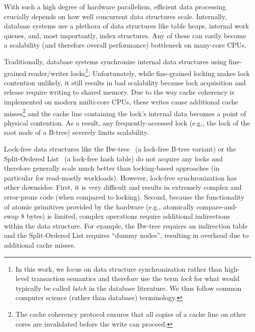 \documentclass[11pt]{article}
\begin{document}
With such a high degree of hardware parallelism, efficient data processing crucially depends on how well concurrent data structures scale.
Internally, database systems use a plethora of data structures like table heaps, internal work queues, and, most importantly, index structures.
Any of these can easily become a scalability (and therefore overall performance) bottleneck on many-core CPUs.

Traditionally, database systems synchronize internal data structures using fine-grained reader/writer locks\footnote{In this work, we focus on data structure synchronization rather than high-level transaction semantics and therefore use the term {\em lock} for what would typically be called {\em latch} in the database literature. We thus follow common computer science (rather than database) terminology.}.
Unfortunately, while fine-grained locking makes lock contention unlikely, it still results in bad scalability because lock acquisition and release require writing to shared memory.
Due to the way cache coherency is implemented on modern multi-core CPUs, these writes cause additional cache misses\footnote{The cache coherency protocol ensures that all copies of a cache line on other cores are invalidated before the write can proceed.} and the cache line containing the lock's internal data becomes a point of physical contention.
As a result, any frequently-accessed lock (e.g., the lock of the root node of a B-tree) severely limits scalability.

Lock-free data structures like the Bw-tree~\cite{DBLP:conf/icde/LevandoskiLS13a} (a lock-free B-tree variant) or the Split-Ordered List~\cite{DBLP:journals/jacm/ShalevS06} (a lock-free hash table) do not acquire any locks and therefore generally scale much better than locking-based approaches (in particular for read-mostly workloads).
However, lock-free synchronization has other downsides:
First, it is very difficult and results in extremely complex and error-prone code (when compared to locking).
Second, because the functionality of atomic primitives provided by the hardware (e.g., atomically compare-and-swap 8 bytes) is limited, complex operations require additional indirections within the data structure.
For example, the Bw-tree requires an indirection table and the Split-Ordered List requires ``dummy nodes'', resulting in overhead due to additional cache misses.
\end{document}
